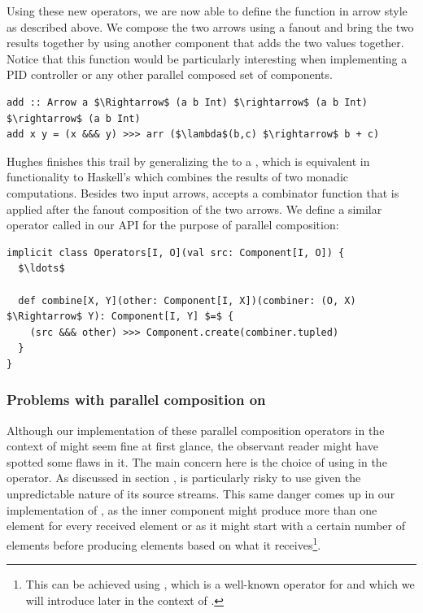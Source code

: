 Using these new operators, we are now able to define the  function in arrow style as described above. We compose the two arrows using a fanout and bring the two results together by using another component that adds the two values together. Notice that this function would be particularly interesting when implementing a PID controller or any other parallel composed set of components.

\begin{lstlisting}[style=InlineHaskellStyle]
add :: Arrow a $\Rightarrow$ (a b Int) $\rightarrow$ (a b Int) $\rightarrow$ (a b Int)
add x y = (x &&& y) >>> arr ($\lambda$(b,c) $\rightarrow$ b + c)
\end{lstlisting}

Hughes finishes this trail by generalizing the  to a , which is equivalent in functionality to Haskell's  which combines the results of two monadic computations. Besides two input arrows,  accepts a combinator function that is applied after the fanout composition of the two arrows. We define a similar operator called  in our API for the purpose of parallel composition:

\begin{minipage}{\linewidth}
\begin{lstlisting}[style=ScalaStyle, caption={Implementation of the \code{Arrow}'s \code{liftA2} or \code{combine} operator}, label={lst:combine-operator}]
implicit class Operators[I, O](val src: Component[I, O]) {
  $\ldots$

  def combine[X, Y](other: Component[I, X])(combiner: (O, X) $\Rightarrow$ Y): Component[I, Y] $=$ {
    (src &&& other) >>> Component.create(combiner.tupled)
  }
}
\end{lstlisting}
\end{minipage}

\subsubsection{Problems with parallel composition on \comp}
Although our implementation of these parallel composition operators in the context of \comp might seem fine at first glance, the observant reader might have spotted some flaws in it. The main concern here is the choice of using  in the  operator. As discussed in section ,  is particularly risky to use given the unpredictable nature of its source streams. This same danger comes up in our implementation of , as the inner component might produce more than one element for every received element or as it might start with a certain number of elements before producing elements based on what it receives\footnote{This can be achieved using , which is a well-known operator for \obs and which we will introduce later in the context of \comp.}.

